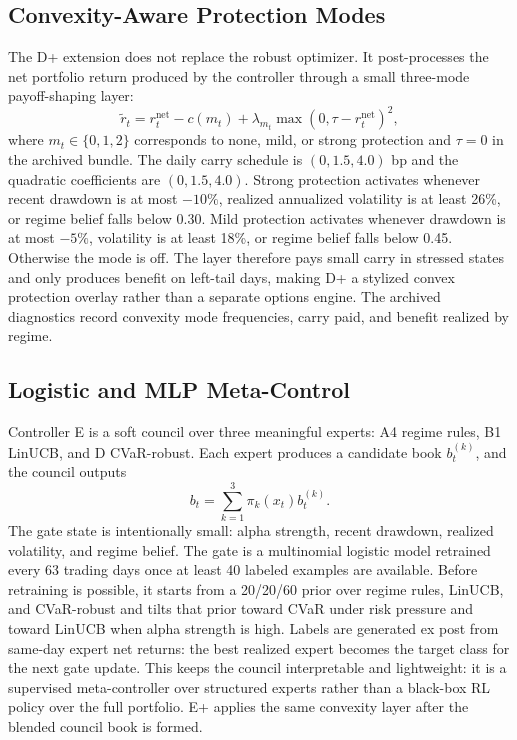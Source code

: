 \documentclass[11pt]{article}
\begin{document}
\subsection{Convexity-Aware Protection Modes}

The D+ extension does not replace the robust optimizer. It post-processes the
net portfolio return produced by the controller through a small three-mode
payoff-shaping layer:
\[
\tilde r_t = r_t^{\mathrm{net}} - c(m_t)
+ \lambda_{m_t}\max(0,\tau-r_t^{\mathrm{net}})^2,
\]
where $m_t \in \{0,1,2\}$ corresponds to none, mild, or strong protection and
$\tau=0$ in the archived bundle. The daily carry schedule is $(0,1.5,4.0)$ bp
and the quadratic coefficients are $(0,1.5,4.0)$. Strong protection activates
whenever recent drawdown is at most $-10\%$, realized annualized volatility is
at least 26\%, or regime belief falls below 0.30. Mild protection activates
whenever drawdown is at most $-5\%$, volatility is at least 18\%, or regime
belief falls below 0.45. Otherwise the mode is off. The layer therefore pays
small carry in stressed states and only produces benefit on left-tail days,
making D+ a stylized convex protection overlay rather than a separate options
engine. The archived diagnostics record convexity mode frequencies, carry paid,
and benefit realized by regime.

\subsection{Logistic and MLP Meta-Control}

Controller E is a soft council over three meaningful experts: A4 regime rules,
B1 LinUCB, and D CVaR-robust. Each expert produces a candidate book
$b_t^{(k)}$, and the council outputs
\[
b_t = \sum_{k=1}^3 \pi_k(x_t)b_t^{(k)}.
\]
The gate state is intentionally small: alpha strength, recent drawdown,
realized volatility, and regime belief.
The gate is a multinomial logistic model retrained every 63 trading days once
at least 40 labeled examples are available. Before retraining is possible, it
starts from a 20/20/60 prior over regime rules, LinUCB, and CVaR-robust and
tilts that prior toward CVaR under risk pressure and toward LinUCB when alpha
strength is high. Labels are generated ex post from same-day expert net
returns: the best realized expert becomes the target class for the next gate
update. This keeps the council interpretable and lightweight: it is a
supervised meta-controller over structured experts rather than a black-box RL
policy over the full portfolio. E+ applies the same convexity layer after the
blended council book is formed.
\end{document}
